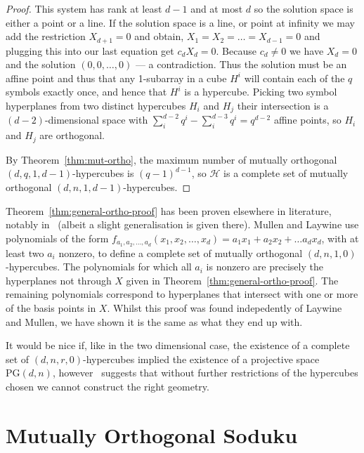\documentclass{article}
\newcommand{\PG}{\mathrm{PG}}
\begin{document}
\begin{proof}
  This system has rank at least \(d - 1\) and at most \(d\) so the solution space is either a point or a line. If the solution space is a line, or point at infinity we may add the restriction \(X_{d + 1} = 0\) and obtain,
  \(X_1 = X_2 = \ldots = X_{d - 1} = 0\) and plugging this into our last equation get \(c_d X_d = 0\). Because \(c_d \neq 0\) we have \(X_d = 0\) and the solution \((0, 0, \ldots, 0)\) --- a contradiction. Thus the solution must be an affine point and thus that any 1-subarray in a cube \(H^{i}\) will contain each of the \(q\) symbols exactly once, and hence that \(H^{i}\) is a hypercube.
  Picking two symbol hyperplanes from two distinct hypercubes \(H_{i}\) and \(H_{j}\) their intersection is a \((d - 2)\)-dimensional space with \(\sum_i^{d - 2} q^{i} - \sum_i^{d - 3} q^{i} = q^{d - 2}\) affine points, so \(H_{i}\) and \(H_{j}\) are orthogonal.

  By Theorem~\ref{thm:mut-ortho}, the maximum number of mutually orthogonal \((d, q, 1, d - 1)\)-hypercubes is \((q - 1)^{d - 1}\), so \(\mathcal{H}\) is a complete set of mutually orthogonal \((d, n, 1, d - 1)\)-hypercubes.
\end{proof}


Theorem~\ref{thm:general-ortho-proof} has been proven elsewhere in literature, notably in~\cite{MR1644242} (albeit a slight generalisation is given there). Mullen and Laywine use polynomials of the form \(f_{a_1, a_2, \ldots, a_d}(x_1, x_2, \ldots, x_d) = a_1x_1 + a_2x_2 + \ldots a_d x_d\), with at least two \(a_i\) nonzero, to define a complete set of mutually orthogonal \((d, n, 1, 0)\)-hypercubes.
The polynomials for which all \(a_i\) is nonzero are precisely the hyperplanes not through \(X\) given in Theorem~\ref{thm:general-ortho-proof}. The remaining polynomials correspond to hyperplanes that intersect with one or more of the basis points in \(X\). Whilst this proof was found indepedently of Laywine and Mullen,
we have shown it is the same as what they end up with.

It would be nice if, like in the two dimensional case, the existence of a complete set of \((d,n,r,0)\)-hypercubes implied the existence of a projective space \(\PG(d, n)\), 
however~\cite{MR1904388} suggests that without further restrictions of the hypercubes chosen we cannot construct the right geometry.

\section{Mutually Orthogonal Soduku}
\end{document}
